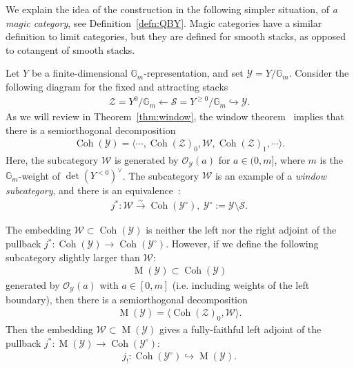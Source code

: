 \documentclass [11pt,oneside,a4paper,mathscr]{amsart}
\theoremstyle{definition}
\renewcommand{\geq}{\geqslant}
\newcommand{\Y}{\mathcal{Y}}
\newcommand{\MM}{\operatorname{M}}
\newcommand{\Coh}{\operatorname{Coh}}
\begin{document}
\medskip

We explain the idea of the construction in the following simpler situation, of \textit{a magic category}, see Definition~\ref{defn:QBY}. 
Magic categories have a similar definition to limit categories, but they are defined for smooth stacks, as opposed to cotangent of smooth stacks.


Let $Y$ be a finite-dimensional $\mathbb{G}_m$-representation, and set $\Y=Y/\mathbb{G}_m$. 
Consider the following diagram for the fixed and attracting stacks 
\begin{align*}
    \mathcal{Z}=Y^0/\mathbb{G}_m \leftarrow \mathcal{S}=Y^{\geq 0}/\mathbb{G}_m \hookrightarrow \mathcal{Y}.
\end{align*}
As we will review in Theorem~\ref{thm:window}, the window theorem~\cite{HL} implies that there is a 
semiorthogonal decomposition 
\begin{align*}
    \Coh(\Y)=\langle \cdots, \Coh(\mathcal{Z})_{0}, \mathcal{W}, \Coh(\mathcal{Z})_1, \cdots\rangle.
\end{align*}
Here, the subcategory $\mathcal{W}$
is generated by $\mathcal{O}_{\Y}(a)$ for $a\in (0, m]$, where 
$m$ is the $\mathbb{G}_m$-weight of $\det (Y^{<0})^{\vee}$. The subcategory $\mathcal{W}$ is an example of a \textit{window subcategory}, and there is an equivalence~\cite{HL}: 
\begin{align*}
    j^* \colon \mathcal{W} \stackrel{\sim}{\to} \Coh(\mathcal{Y}^{\circ}), \ 
    \mathcal{Y}^{\circ}:=\mathcal{Y}\setminus \mathcal{S}. 
\end{align*}

The embedding $\mathcal{W} \subset \Coh(\Y)$ is neither the left nor the right adjoint of 
the pullback $j^* \colon \Coh(\Y) \to \Coh(\Y^{\circ})$. However, if we define the following subcategory slightly larger than $\mathcal{W}$:
\begin{align}\label{sod:LY}
    \MM(\mathcal{Y}) \subset \Coh(\mathcal{Y})
\end{align}
generated by $\mathcal{O}_{\mathcal{Y}}(a)$
with $a\in [0, m]$ (i.e. including weights of the left boundary), then 
there is a semiorthogonal decomposition 
\begin{align*}
    \MM(\mathcal{Y})=\langle \Coh(\mathcal{Z})_0, \mathcal{W} \rangle. 
\end{align*}
Then the embedding $\mathcal{W} \subset \MM(\mathcal{Y})$ gives a fully-faithful left adjoint of the pullback
$j^* \colon \MM(\mathcal{Y}) \to \Coh(\Y^{\circ})$: 
\begin{align*}
    j_!\colon \Coh(\mathcal{Y}^{\circ})\hookrightarrow \MM(\mathcal{Y}).
\end{align*}
\end{document}
